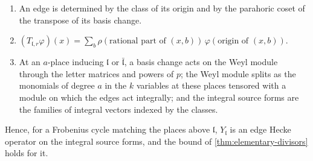 \begin{proposition}\label{prop:hecke-edges}
\begin{enumerate}[label=\textup{(\alph*)}]
\item An edge is determined by the class of its origin and by the parahoric coset of the transpose of its basis change.
\item $(T_{\mathfrak l,r}\varphi)(x)=\sum_b\rho(\text{rational part of }(x,b))\,\varphi(\text{origin of }(x,b))$.
\item At an $a$-place inducing $\mathfrak l$ or $\bar{\mathfrak l}$, a basis change acts on the Weyl module through the letter matrices and powers of $p$; the
Weyl module splits as the monomials of degree $a$ in the $k$ variables at these places tensored with a module on which the edges act integrally;
and the integral source forms are the families of integral vectors indexed by the classes.
\end{enumerate}
Hence, for a Frobenius cycle matching the places above $\mathfrak l$, $Y_{\mathfrak l}$ is an edge Hecke operator on the integral source forms, and the
bound of \cref{thm:elementary-divisors} holds for it.
\end{proposition}

